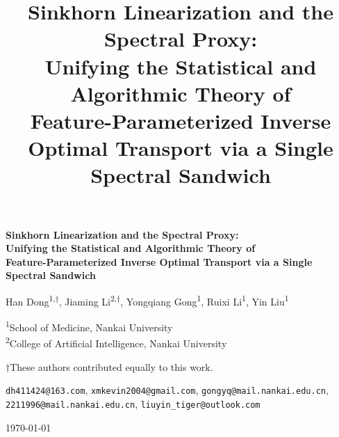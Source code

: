 \documentclass[11pt,a4paper]{article}
\title{Sinkhorn Linearization and the Spectral Proxy:\\
Unifying the Statistical and Algorithmic Theory of\\
Feature-Parameterized Inverse Optimal Transport via a Single Spectral Sandwich}
\author{}
\date{}
\theoremstyle{remark}
\begin{document}
\begin{center}
{\LARGE\bfseries Sinkhorn Linearization and the Spectral Proxy:\\
Unifying the Statistical and Algorithmic Theory of\\
Feature-Parameterized Inverse Optimal Transport via a Single Spectral Sandwich}

\vspace{1.5em}

{\large Han Dong\textsuperscript{1,$\dagger$},\; Jiaming Li\textsuperscript{2,$\dagger$},\;
Yongqiang Gong\textsuperscript{1},\; Ruixi Li\textsuperscript{1},\;
Yin Liu\textsuperscript{1}}

\vspace{0.8em}

{\normalsize \textsuperscript{1}School of Medicine, Nankai University\\
\textsuperscript{2}College of Artificial Intelligence, Nankai University}

\vspace{0.5em}

{\small $\dagger$These authors contributed equally to this work.}

\vspace{0.8em}

{\small \texttt{dh411424@163.com},\; \texttt{xmkevin2004@gmail.com},\;
\texttt{gongyq@mail.nankai.edu.cn},\; \texttt{2211996@mail.nankai.edu.cn},\;
\texttt{liuyin\_tiger@outlook.com}}

\vspace{0.8em}

{\normalsize \today}
\end{center}
\end{document}

